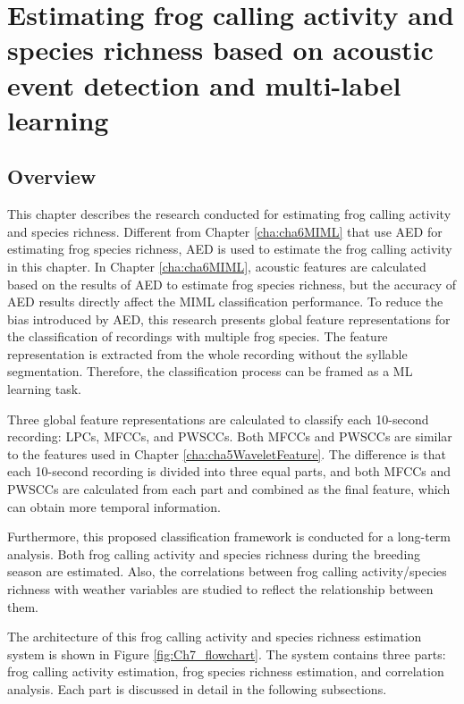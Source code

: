 
\chapter{Estimating frog calling activity and species richness based on acoustic event detection and multi-label learning}
\label{cha:cha7ML}


\section{Overview}
\label{sect:introduction}

This chapter describes the research conducted for estimating frog calling activity and species richness. Different from Chapter \ref{cha:cha6MIML} that use AED for estimating frog species richness, AED is used to estimate the frog calling activity in this chapter.
In Chapter \ref{cha:cha6MIML}, acoustic features are calculated based on the results of AED to estimate frog species richness, but the accuracy of AED results directly affect the MIML classification performance.
To reduce the bias introduced by AED, this research presents global feature representations for the classification of recordings with multiple frog species. The feature representation is extracted from the whole recording without the syllable segmentation. Therefore, the classification process can be framed as a ML learning task.  



Three global feature representations are calculated to classify each 10-second recording: LPCs, MFCCs, and PWSCCs. Both MFCCs and PWSCCs are similar to the features used in Chapter \ref{cha:cha5WaveletFeature}. The difference is that each 10-second recording is divided into three equal parts, and both MFCCs and PWSCCs are calculated from each part and combined as the final feature, which can obtain more temporal information.


Furthermore, this proposed classification framework is conducted for a long-term analysis. Both frog calling activity and species richness during the breeding season are estimated. Also, the correlations between frog calling activity/species richness with weather variables are studied to reflect the relationship between them. 

  
The architecture of this frog calling activity and species richness estimation system is shown in Figure \ref{fig:Ch7_flowchart}. The system contains three parts: frog calling activity estimation, frog species richness estimation, and correlation analysis. Each part is discussed in detail in the following subsections.

